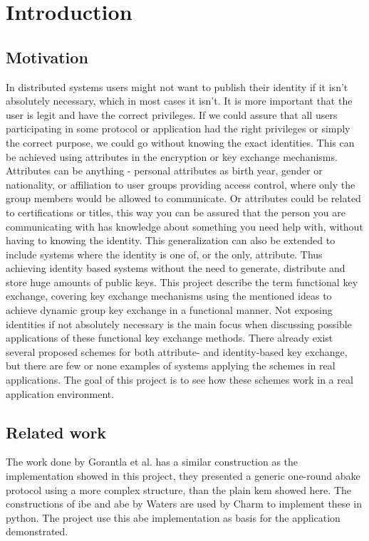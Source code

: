 \chapter{Introduction}
\label{chp:intro} 
\section{Motivation}
In distributed systems users might not want to publish their identity if it isn't absolutely necessary, which in most cases it isn't. It is more important that the user is legit and have the correct privileges. If we could assure that all users participating in some protocol or application had the right privileges or simply the correct purpose, we could go without knowing the exact identities. This can be achieved using attributes in the encryption or key exchange mechanisms. Attributes can be anything - personal attributes as birth year, gender or nationality, or affiliation to user groups providing access control, where only the group members would be allowed to communicate. Or attributes could be related to certifications or titles, this way you can be assured that the person you are communicating with has knowledge about something you need help with, without having to knowing the identity. This generalization can also be extended to include systems where the identity is one of, or the only, attribute. Thus achieving identity based systems without the need to generate, distribute and store huge amounts of public keys. This project describe the term functional key exchange, covering key exchange mechanisms using the mentioned ideas to achieve dynamic group key exchange in a functional manner. Not exposing identities if not absolutely necessary is the main focus when discussing possible applications of these functional key exchange methods. There already exist several proposed schemes for both attribute- and identity-based key exchange, but there are few or none examples of systems applying the schemes in real applications. The goal of this project is to see how these schemes work in a real application environment.

\section{Related work}\label{sec:related_work}
The work done by Gorantla et al.\cite{gorantla2010attribute} has a similar construction as the implementation showed in this project, they presented a generic one-round \gls{abake} protocol using a more complex structure, than the plain \gls{kem} showed here. The constructions of \gls{ibe} and \gls{abe} by Waters\cite{ibe_waters09, abe_waters09} are used by Charm\cite{DBLP:Charm13} to implement these in python. The project use this \gls{abe} implementation as basis for the application demonstrated. 

